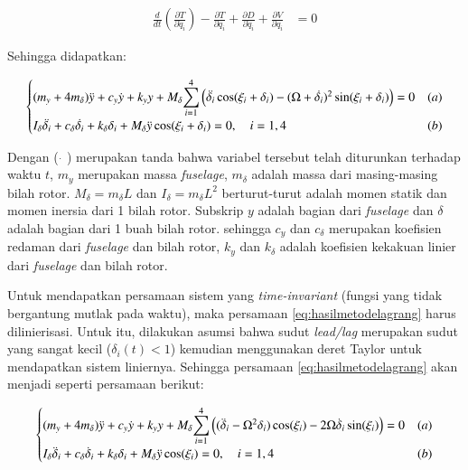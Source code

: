 \begin{align}
	\frac{d}{dt}\left(\frac{\partial T}{\partial \dot{q}_i}\right) - \frac{\partial T}{\partial q_i} + \frac{\partial D}{\partial \dot{q}_i} + \frac{\partial V}{\partial q_i} &= 0
	\label{eq:lagrange_eq}
\end{align}

Sehingga didapatkan:

\begin{equation}
	\begin{cases}
		(m_y+4m_\delta)\ddot{y}+c_y\dot{y}+k_yy+M_\delta\mathlarger{\sum}_{i=1}^{4}\left(\ddot{\delta_i}\cos(\xi_i+\delta_i)-(\Omega+\dot{\delta_i})^2\sin(\xi_i+\delta_i)\right) = 0 & (a) \\
		I_\delta\ddot{\delta_i}+c_\delta\dot{\delta_i}+k_\delta\delta_i+M_\delta \ddot{y}\cos(\xi_i+\delta_i)=0, \quad i=1,4 & (b)
	\end{cases}
	\label{eq:hasilmetodelagrang}
\end{equation}

Dengan ( $\dot{}$ ) merupakan tanda bahwa variabel tersebut telah diturunkan terhadap waktu $t$, $m_y$ merupakan massa \textit{fuselage}, $m_\delta$ adalah massa dari masing-masing bilah rotor. $M_\delta = m_\delta L$ dan $I_\delta = m_\delta L^2$ berturut-turut adalah momen statik dan momen inersia dari 1 bilah rotor. Subskrip $y$ adalah bagian dari \textit{fuselage} dan $\delta$ adalah bagian dari 1 buah bilah rotor. sehingga $c_y$ dan $c_\delta$ merupakan koefisien redaman dari \textit{fuselage} dan bilah rotor, $k_y$ dan $k_\delta$ adalah koefisien kekakuan linier dari \textit{fuselage} dan bilah rotor.

Untuk mendapatkan persamaan sistem yang \textit{time-invariant} (fungsi yang tidak bergantung mutlak pada waktu), maka persamaan \ref{eq:hasilmetodelagrang} harus dilinierisasi. Untuk itu, dilakukan asumsi bahwa sudut \textit{lead/lag} merupakan sudut yang sangat kecil ($\delta_i(t)<1$) kemudian menggunakan deret Taylor untuk mendapatkan sistem liniernya. Sehingga persamaan \ref{eq:hasilmetodelagrang} akan menjadi seperti persamaan berikut:

\begin{equation}
	\begin{cases}
		(m_y+4m_\delta)\ddot{y}+c_y\dot{y}+k_yy+M_\delta\mathlarger{\sum}_{i=1}^{4}\left((\ddot{\delta}_i-\Omega^2\delta_i)\cos(\xi_i)-2\Omega \dot{\delta}_i\sin(\xi_i)\right) = 0 & (a) \\
		I_\delta\ddot{\delta}_i+c_\delta\dot{\delta}_i+k_\delta\delta_i+M_\delta \ddot{y}\cos(\xi_i)=0, \quad i=1,4 & (b)
	\end{cases}
\label{eq:linearisasi_sudutkecil}
\end{equation}

